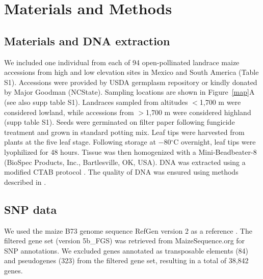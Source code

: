 \section*{Materials and Methods}

\subsection*{Materials and DNA extraction}
We included one individual from each of 94 open-pollinated landrace maize accessions from high and low elevation sites in Mexico and South America (Table S1).  Accessions were provided by USDA germplasm repository or kindly donated by Major Goodman (NCState).  
Sampling locations are shown in Figure~\ref{map}A (see also supp table S1).  
Landraces sampled from altitudes $<$1,700 m were considered lowland, while accessions from $>$1,700 m were considered highland (supp table S1).  
Seeds were germinated on filter paper following fungicide treatment and grown in standard potting mix.  Leaf tips were harvested from plants at the five leaf stage.  Following storage at $-80{}^\circ$C overnight, leaf tips were lyophilized for 48 hours.  Tissue was then homogenized with a Mini-Beadbeater-8 (BioSpec Products, Inc., Bartlesville, OK, USA).  DNA was extracted using a modified CTAB protocol \cite[]{CTAB}.  The quality of DNA was ensured using methods described in \cite{vanHeerwaarden_2011_21189301}.

\subsection*{SNP data}
We used the maize B73 genome sequence RefGen version 2 as a reference \cite[]{Schnable_2009_19965430}.  
The filtered gene set (version 5b\_FGS) was retrieved from MaizeSequence.org for SNP annotations.  
We excluded genes annotated as transposable elements (84) and pseudogenes (323) from the filtered gene set, resulting in a total of 38,842 genes.


